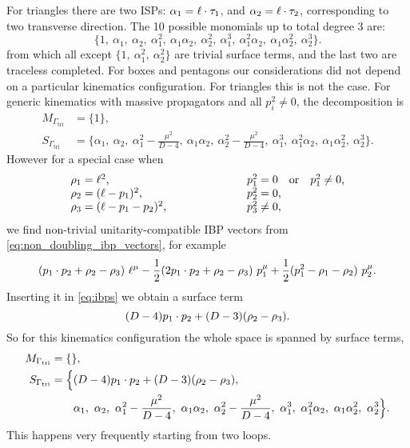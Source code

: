 For triangles there are two ISPs: $ \alpha_1 = \sp(\ell,\tau_1)$, and $\alpha_2 = \sp(\ell,\tau_2)$,
corresponding to two transverse direction.
The 10 possible monomials up to total degree 3 are:
\[
\{1,~\alpha_1,~\alpha_2,~\alpha_1^2,~\alpha_1\alpha_2,~\alpha_2^2,~ \alpha_1^3,~ \alpha_1^2\alpha_2,~ \alpha_1\alpha_2^2,~ \alpha_2^3\}.
\]
from which all except $\{1,~\alpha_1^2,~\alpha_2^2\}$ are trivial surface terms,
and the last two are traceless completed.
For boxes and pentagons our considerations did not depend on a particular kinematics configuration.
For triangles this is not the case. For generic kinematics with massive propagators
and all $p_i^2\neq 0$, the decomposition is 
\begin{align*}
  M_{\Gamma_\text{tri} } &= \{1\}, \\
   S_{\Gamma_\text{tri} } &= 
  \{\alpha_1,~\alpha_2,~\alpha_1^2 - \frac{\mu^2}{D-4},~\alpha_1\alpha_2,~\alpha_2^2- \frac{\mu^2}{D-4},~ \alpha_1^3,~ \alpha_1^2\alpha_2,~ \alpha_1\alpha_2^2,~ \alpha_2^3\}.
\end{align*}
However for a special case when
\begin{equation}
  \begin{tabular}{ll}
    $\rho_1 = \ell^2$,               &  $p_1^2=0 \qor p_1^2\neq 0$, \\
    $\rho_2 = (\ell-p_1)^2$,         &  $p_2^2=0$,  \\
    $\rho_3 = (\ell-p_1-p_2)^2$, \hspace{2cm}    & $p_3^2\neq 0$, \\
  \end{tabular}
\end{equation}
we find non-trivial unitarity-compatible IBP vectors from \cref{eq:non_doubling_ibp_vectors}, for example
\[
  (\sp(p_1,p_2) + \rho_2 - \rho_3)~\ell^\mu  - \frac{1}{2} (2 \sp(p_1,p_2) + \rho_2 - \rho_3)~p_1^\mu  + \frac{1}{2}   (p_1^2 - \rho_1 - \rho_2)~p_2^\mu.
\]
Inserting it in \cref{eq:ibps} we obtain a surface term
\[  
  (D-4) \sp(p_1,p_2) + (D-3) (\rho_2-\rho_3).
\]
So for this kinematics configuration the whole space is spanned by surface terms,
\begin{align*}
  M_{\Gamma_\text{tri} } &= \{\}, \\
   S_{\Gamma_\text{tri} } &= 
  \Big\{(D-4) \sp(p_1,p_2) + (D-3) (\rho_2-\rho_3),\\ 
    &\qquad \alpha_1,~\alpha_2,~\alpha_1^2 - \frac{\mu^2}{D-4},~\alpha_1\alpha_2,~\alpha_2^2- \frac{\mu^2}{D-4},~ \alpha_1^3,~ \alpha_1^2\alpha_2,~ \alpha_1\alpha_2^2,~ \alpha_2^3 \Big\}.
\end{align*}
This happens very frequently starting from two loops.


